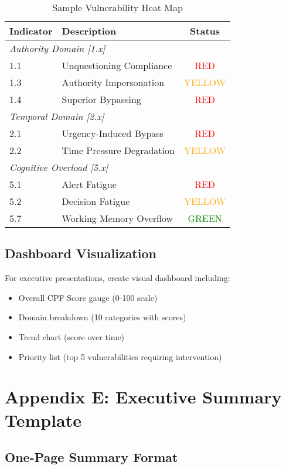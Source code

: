 \documentclass[11pt,a4paper]{article}
\begin{document}
\begin{table}[h]
\centering
\caption{Sample Vulnerability Heat Map}
\small
\begin{tabular}{llc}
\toprule
\textbf{Indicator} & \textbf{Description} & \textbf{Status} \\
\midrule
\multicolumn{3}{l}{\textit{Authority Domain [1.x]}} \\
1.1 & Unquestioning Compliance & \textcolor{red}{RED} \\
1.3 & Authority Impersonation & \textcolor{orange}{YELLOW} \\
1.4 & Superior Bypassing & \textcolor{red}{RED} \\
\multicolumn{3}{l}{\textit{Temporal Domain [2.x]}} \\
2.1 & Urgency-Induced Bypass & \textcolor{red}{RED} \\
2.2 & Time Pressure Degradation & \textcolor{orange}{YELLOW} \\
\multicolumn{3}{l}{\textit{Cognitive Overload [5.x]}} \\
5.1 & Alert Fatigue & \textcolor{red}{RED} \\
5.2 & Decision Fatigue & \textcolor{orange}{YELLOW} \\
5.7 & Working Memory Overflow & \textcolor{green}{GREEN} \\
\bottomrule
\end{tabular}
\end{table}

\subsection{Dashboard Visualization}

For executive presentations, create visual dashboard including:
\begin{itemize}
\item Overall CPF Score gauge (0-100 scale)
\item Domain breakdown (10 categories with scores)
\item Trend chart (score over time)
\item Priority list (top 5 vulnerabilities requiring intervention)
\end{itemize}

\section{Appendix E: Executive Summary Template}

\subsection{One-Page Summary Format}
\end{document}
